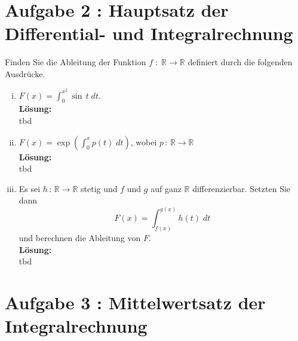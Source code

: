 \documentclass[11pt,a4paper,ngerman]{article}
\begin{document}

\section*{Aufgabe 2 : \mdseries Hauptsatz der Differential- und Integralrechnung}

Finden Sie die Ableitung der Funktion $f \; : \; \mathbb{R} \rightarrow \mathbb{R}$ definiert durch die folgenden Ausdrücke.

\begin{enumerate}[i)]
    \item $F(x) = \int_{0}^{x^2} \sin \, t \; dt$.\\

\textbf{Lösung:}\\
tbd
    
    \item $F(x) = \exp \left( \int_{0}^{x} p(t)\; dt\right)$, wobei $p \, : \, \mathbb{R} \rightarrow \mathbb{R}$\\

\textbf{Lösung:}\\

tbd

    \item Es sei $h \, : \, \mathbb{R} \rightarrow \mathbb{R}$ stetig und $f$ und $g$ auf ganz $\mathbb{R}$ differenzierbar. Setzten Sie dann
$$
    F(x) = \int_{f(x)}^{g(x)} h(t) \; dt
$$
und berechnen die Ableitung von $F$.\\

\textbf{Lösung:}\\

tbd

\end{enumerate}

\section*{Aufgabe 3 : \mdseries Mittelwertsatz der Integralrechnung}
\end{document}
